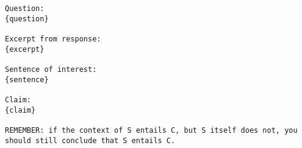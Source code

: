 \begin{tcolorbox}[
    breakable,                    
    colback=white,                
    colframe=black,              
    title=Entailment User Prompt,       
    title after break=Entailment User Prompt (Continued),
    fonttitle=\bfseries, 
    coltext=black,
]
\begin{lstlisting}[breaklines=true, breakindent=0pt, basicstyle=\small\ttfamily\raggedright, xleftmargin=-5pt, frame=none, xrightmargin=-5pt, aboveskip=-2pt, belowskip=-2pt]
Question:
{question}

Excerpt from response: 
{excerpt}

Sentence of interest: 
{sentence}

Claim:
{claim}

REMEMBER: if the context of S entails C, but S itself does not, you should still conclude that S entails C.
\end{lstlisting}
\end{tcolorbox}